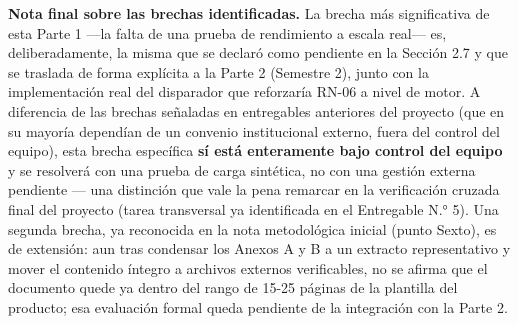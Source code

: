\documentclass[11pt,a4paper]{article}
\begin{document}
\textbf{Nota final sobre las brechas identificadas.} La brecha más significativa de esta Parte 1 ---la falta de una prueba de rendimiento a escala real--- es, deliberadamente, la misma que se declaró como pendiente en la Sección 2.7 y que se traslada de forma explícita a la Parte 2 (Semestre 2), junto con la implementación real del disparador que reforzaría RN-06 a nivel de motor. A diferencia de las brechas señaladas en entregables anteriores del proyecto (que en su mayoría dependían de un convenio institucional externo, fuera del control del equipo), esta brecha específica \textbf{sí está enteramente bajo control del equipo} y se resolverá con una prueba de carga sintética, no con una gestión externa pendiente --- una distinción que vale la pena remarcar en la verificación cruzada final del proyecto (tarea transversal ya identificada en el Entregable N.° 5). Una segunda brecha, ya reconocida en la nota metodológica inicial (punto Sexto), es de extensión: aun tras condensar los Anexos A y B a un extracto representativo y mover el contenido íntegro a archivos externos verificables, no se afirma que el documento quede ya dentro del rango de 15-25 páginas de la plantilla del producto; esa evaluación formal queda pendiente de la integración con la Parte 2.
\end{document}

